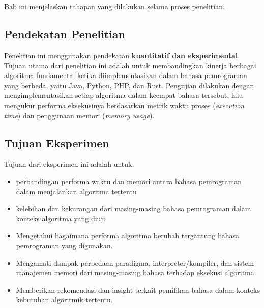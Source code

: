 \chapter{\babTiga}
\label{bab:3}
Bab ini menjelaskan tahapan yang dilakukan selama proses penelitian.



\section{Pendekatan Penelitian}
\label{sec:pendekatanPenelitian}
Penelitian ini menggunakan pendekatan \textbf{kuantitatif dan eksperimental}. Tujuan utama dari penelitian ini adalah untuk membandingkan kinerja berbagai algoritma fundamental ketika diimplementasikan dalam bahasa pemrograman yang berbeda, yaitu Java, Python, PHP, dan Rust. Pengujian dilakukan dengan mengimplementasikan setiap algoritma dalam keempat bahasa tersebut, lalu mengukur performa eksekusinya berdasarkan metrik waktu proses (\textit{execution time}) dan penggunaan memori (\textit{memory usage}).


\section{Tujuan Eksperimen}
\label{sec:tujuanEksperimen}
Tujuan dari eksperimen ini adalah untuk:
\begin{itemize}
	\item perbandingan performa waktu dan memori antara bahasa pemrograman dalam menjalankan algoritma tertentu
	\item kelebihan dan kekurangan dari masing-masing bahasa pemrograman dalam konteks algoritma yang diuji
	\item Mengetahui bagaimana performa algoritma berubah tergantung bahasa pemrograman yang digunakan.
	\item Mengamati dampak perbedaan paradigma, interpreter/kompiler, dan sistem manajemen memori dari masing-masing bahasa terhadap eksekusi algoritma.
	\item Memberikan rekomendasi dan insight terkait pemilihan bahasa dalam konteks kebutuhan algoritmik tertentu.
\end{itemize}

